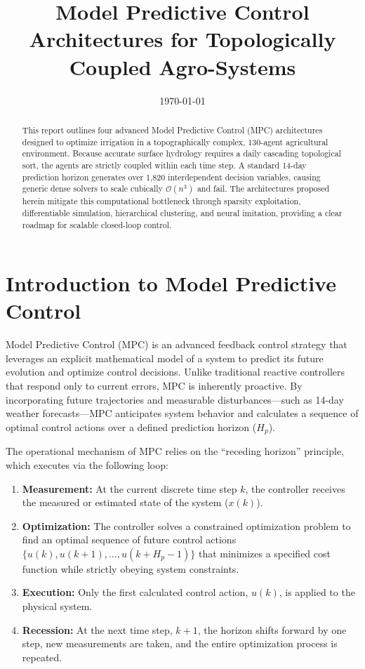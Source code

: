 \documentclass[12pt, a4paper]{article}
\title{\textbf{Model Predictive Control Architectures for Topologically Coupled Agro-Systems}}
\author{} %
\date{\today}
\begin{document}
\maketitle

\begin{abstract}
This report outlines four advanced Model Predictive Control (MPC) architectures designed to optimize irrigation in a topographically complex, 130-agent agricultural environment. Because accurate surface hydrology requires a daily cascading topological sort, the agents are strictly coupled within each time step. A standard 14-day prediction horizon generates over 1,820 interdependent decision variables, causing generic dense solvers to scale cubically $\mathcal{O}(n^3)$ and fail. The architectures proposed herein mitigate this computational bottleneck through sparsity exploitation, differentiable simulation, hierarchical clustering, and neural imitation, providing a clear roadmap for scalable closed-loop control.
\end{abstract}

\section{Introduction to Model Predictive Control}
\label{sec:intro_mpc}

Model Predictive Control (MPC) is an advanced feedback control strategy that leverages an explicit mathematical model of a system to predict its future evolution and optimize control decisions. Unlike traditional reactive controllers that respond only to current errors, MPC is inherently proactive. By incorporating future trajectories and measurable disturbances—such as 14-day weather forecasts—MPC anticipates system behavior and calculates a sequence of optimal control actions over a defined prediction horizon ($H_p$).



The operational mechanism of MPC relies on the ``receding horizon'' principle, which executes via the following loop:
\begin{enumerate}
    \item \textbf{Measurement:} At the current discrete time step $k$, the controller receives the measured or estimated state of the system ($x(k)$).
    \item \textbf{Optimization:} The controller solves a constrained optimization problem to find an optimal sequence of future control actions $\{u(k), u(k+1), \dots, u(k+H_p-1)\}$ that minimizes a specified cost function while strictly obeying system constraints.
    \item \textbf{Execution:} Only the first calculated control action, $u(k)$, is applied to the physical system. 
    \item \textbf{Recession:} At the next time step, $k+1$, the horizon shifts forward by one step, new measurements are taken, and the entire optimization process is repeated. 
\end{enumerate}
\end{document}
